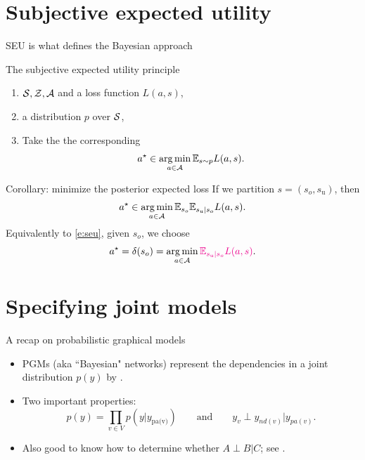 \documentclass[10pt]{beamer}
\begin{document}
\section{Subjective expected utility}
\begin{frame}{SEU is what defines the Bayesian approach}
\begin{block}{The subjective expected utility principle}
\begin{enumerate}
\item {} $\mathcal{S}, \mathcal{Z}, \mathcal{A}$ and a loss function $L(a,s)$,
\item {} a distribution $p$ over $\mathcal{S}$,
\item Take the the corresponding 
\begin{equation}
a^\star \in \operatorname*{arg\,min}_{a\in\mathcal{A}} \mathbb{E}_{s\sim p} L(a,s).
\label{e:seu}
\end{equation}
\end{enumerate}
\end{block}
\vfill

\begin{block}{Corollary: minimize the posterior expected loss}
If we partition $s=(s_{o}, s_{\text{u}})$, then
$$ a^\star \in \operatorname*{arg\,min}_{a\in\mathcal{A}} \mathbb{E}_{s_{o}} \mathbb{E}_{s_{\text{u}}\vert s_{o}} L(a,s).$$
Equivalently to \eqref{e:seu}, given $s_o$, we choose
$$
a^\star = \delta(s_o) = \operatorname*{arg\,min}_{a\in\mathcal{A}} \textcolor{magenta}{\mathbb{E}_{s_{\text{u}}\vert s_{o}} L(a,s)}.$$
\end{block}
\end{frame}

\section{Specifying joint models}
\begin{frame}{A recap on probabilistic graphical models}
  \begin{itemize}
    \item PGMs (aka ``Bayesian" networks) represent the dependencies in a joint distribution $p(y)$ by .
    \item Two important properties:
    $$
    p(y) = \prod_{v\in V} p(y\vert y_{\text{pa(v)}}) \qquad\text{and}\qquad
    y_v \perp y_{nd(v)} \vert y_{pa(v)}.
    $$
    \blank
    \item Also good to know how to determine whether $A\perp B\vert C$; see \citep[Section 10.5]{Mur12}.
  \end{itemize}
  \blank
\end{frame}
\end{document}
